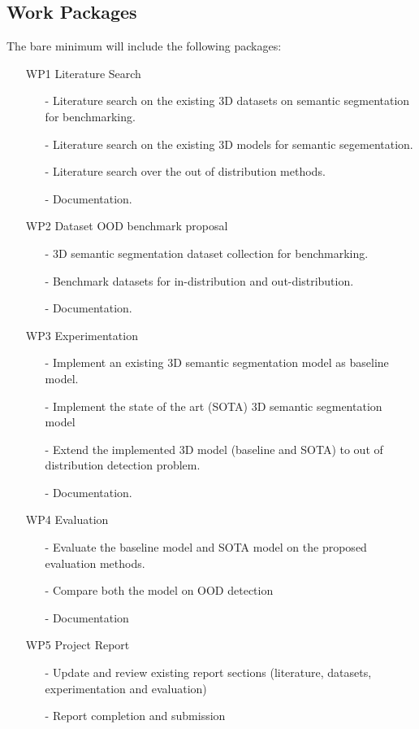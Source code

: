 \documentclass[thesis]{mas_proposal}
\begin{document}
\subsection{Work Packages}
The bare minimum will include the following packages:
\begin{enumerate}
    \item[WP1] Literature Search
    \begin{itemize}
        \item[-] Literature search on the existing 3D datasets on semantic segmentation for benchmarking.
        \item[-] Literature search on the existing  3D models for semantic segementation.
        \item[-] Literature search over the out of distribution methods.
        \item[-] Documentation.
    \end{itemize} 
    \item[WP2] Dataset OOD benchmark proposal
    \begin{itemize}
        \item[-] 3D semantic segmentation dataset collection for benchmarking.
        \item[-] Benchmark datasets for in-distribution and out-distribution.
        \item[-] Documentation.
    \end{itemize}
    \item[WP3] Experimentation
    \begin{itemize}
        \item[-] Implement an existing 3D semantic segmentation model as baseline model.
        \item[-] Implement the state of the art (SOTA) 3D semantic segmentation model
        \item[-] Extend the implemented 3D model (baseline and SOTA) to out of distribution detection problem.
        \item[-] Documentation. 
    \end{itemize}
    \item[WP4] Evaluation
    \begin{itemize}
        \item[-] Evaluate the baseline model and SOTA model on the proposed evaluation methods.
        \item[-] Compare both the model on OOD detection
        \item[-] Documentation
    \end{itemize} 
    \item[WP5] Project Report
    \begin{itemize}
        \item[-] Update and review existing report sections (literature, datasets, experimentation and evaluation)
        \item[-] Report completion and submission
    \end{itemize} 
\end{enumerate}
\end{document}
